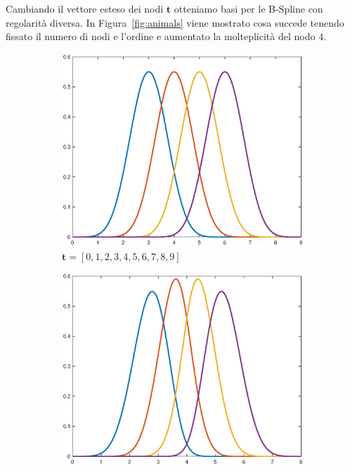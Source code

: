 \documentclass[a4paper, 10pt]{article}
\begin{document}
Cambiando il vettore esteso dei nodi $\mathbf{t}$ otteniamo basi per le B-Spline con regolarità diversa.
In Figura~\ref{fig:animals} viene mostrato cosa succede tenendo fissato il numero di nodi e l'ordine e aumentato la molteplicità del nodo $4$.

\begin{figure}[h]
  \centering
  \begin{subfigure}[b]{0.3\textwidth}
    \includegraphics[width=\textwidth]{figure/6_41.eps}
    \caption{$\mathbf{t} = [0, 1, 2, 3, 4, 5, 6, 7, 8, 9]$}
    \label{fig:641}
  \end{subfigure}
  \begin{subfigure}[b]{0.3\textwidth}
      \includegraphics[width=\textwidth]{figure/6_42.eps}

\end{subfigure}
\end{figure}
\end{document}

